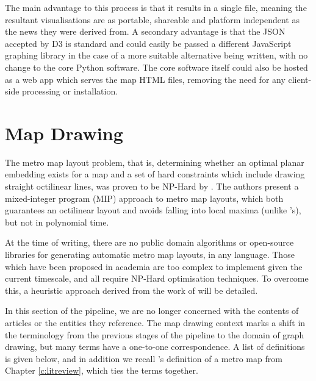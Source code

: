 The main advantage to this process is that it results in a single file, meaning the resultant visualisations are as portable, shareable and platform independent as the news they were derived from. A secondary advantage is that the JSON accepted by D3 is standard and could easily be passed a different JavaScript graphing library in the case of a more suitable alternative being written, with no change to the core Python software. The core software itself could also be hosted as a web app which serves the map HTML files, removing the need for any client-side processing or installation.

\clearpage
\section{Map Drawing} \label{sec:drawing}

The metro map layout problem, that is, determining whether an optimal planar embedding exists for a map and a set of hard constraints which include drawing straight octilinear lines, was proven to be NP-Hard by \cite{AutomatedDrawingOfMetroMaps}. The authors present a mixed-integer program (MIP) approach to metro map layouts, which both guarantees an octilinear layout and avoids falling into local maxima (unlike \citeauthor{AutomaticMetroMapLayoutThesis}'s), but not in polynomial time.

At the time of writing, there are no public domain algorithms or open-source libraries for generating automatic metro map layouts, in any language. Those which have been proposed in academia \citep{AutomaticMetroMapLayoutThesis, AutomatedDrawingOfMetroMaps} are too complex to implement given the current timescale, and all require NP-Hard optimisation techniques. To overcome this, a heuristic approach derived from the work of \citep{AutomaticMetroMapLayoutThesis, AutomaticMetroMapLayout, WhichAesthetic} will be detailed.

In this section of the pipeline, we are no longer concerned with the contents of articles or the entities they reference. The map drawing context marks a shift in the terminology from the previous stages of the pipeline to the domain of graph drawing, but many terms have a one-to-one correspondence. A list of definitions is given below, and in addition we recall \citeauthor{GeneratingInformationMaps}'s definition of a metro map from Chapter \ref{c:litreview}, which ties the terms together.

